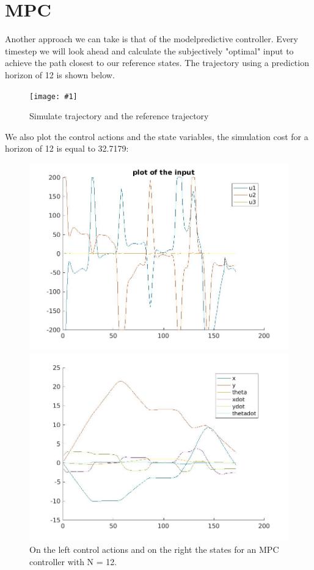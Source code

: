 \documentclass[•]{article}
\newcommand{\apicture}[2] {
  \begin{figure}[H]
  \centering
  \texttt{[image: \#1]}
  \caption{#2}
  \end{figure}
  }
\begin{document}
\section{MPC}
Another approach we can take is that of the modelpredictive controller. Every timestep we will look ahead and calculate the subjectively "optimal" input to achieve the path closest to our reference states. The trajectory using a prediction horizon of 12 is shown below. 

\apicture{mpctraj12}{Simulate trajectory and the reference trajectory}

We also plot the control actions and the state variables, the simulation cost for a horizon of 12 is equal to 32.7179:

\begin{figure}[H]
\begin{minipage}{.45\textwidth}
\includegraphics[width = \textwidth]{lqr1input12.jpg}
\end{minipage}
\begin{minipage}{.45\textwidth}
\includegraphics[width = \textwidth]{lqr1states12.jpg}
\end{minipage}
\caption{On the left control actions and on the right the states for an MPC controller with N = 12. }
\end{figure}
\end{document}
